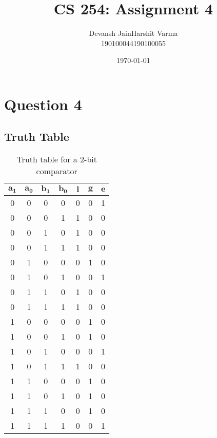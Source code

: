 \documentclass[11pt, fleqn]{article}
\title{CS 254: Assignment 4}
\author{
\begin{tabular}{|c|c|}
     \hline
     Devansh Jain & Harshit Varma \\
     \hline
     190100044 & 190100055 \\
     \hline
\end{tabular}
}
\date{\today}
\renewcommand{\arraystretch}{2}
\begin{document}
\maketitle
\renewcommand{\arraystretch}{1}

\section*{Question 4}
\label{q4}
\setcounter{equation}{0}

\subsection*{Truth Table}
\begin{table}[H]
    \centering
    \begin{tabular}{|c|c|c|c|c|c|c|}
         \hline
         $\mathbf{a_1}$ & $\mathbf{a_0}$ & $\mathbf{b_1}$ & $\mathbf{b_0}$ & $\mathbf{l}$ & $\mathbf{g}$ & $\mathbf{e}$\\
         \hline %
         0 & 0  & 0 & 0      & 0 & 0 & 1\\
         \hline %
         0 & 0  & 0 & 1      & 1 & 0 & 0\\
         \hline %
         0 & 0  & 1 & 0      & 1 & 0 & 0\\
         \hline %
         0 & 0  & 1 & 1      & 1 & 0 & 0\\
         \hline %
         0 & 1  & 0 & 0      & 0 & 1 & 0\\
         \hline %
         0 & 1  & 0 & 1      & 0 & 0 & 1\\
         \hline %
         0 & 1  & 1 & 0      & 1 & 0 & 0\\
         \hline %
         0 & 1  & 1 & 1      & 1 & 0 & 0\\
         \hline %
         1 & 0  & 0 & 0      & 0 & 1 & 0\\
         \hline %
         1 & 0  & 0 & 1      & 0 & 1 & 0\\
         \hline %
         1 & 0  & 1 & 0      & 0 & 0 & 1\\
         \hline %
         1 & 0  & 1 & 1      & 1 & 0 & 0\\
         \hline %
         1 & 1  & 0 & 0      & 0 & 1 & 0\\
         \hline %
         1 & 1  & 0 & 1      & 0 & 1 & 0\\
         \hline %
         1 & 1  & 1 & 0      & 0 & 1 & 0\\
         \hline %
         1 & 1  & 1 & 1      & 0 & 0 & 1\\
         \hline
    \end{tabular}
    \caption{Truth table for a 2-bit comparator}
    \label{tab:tt_comp}
\end{table}
\end{document}
